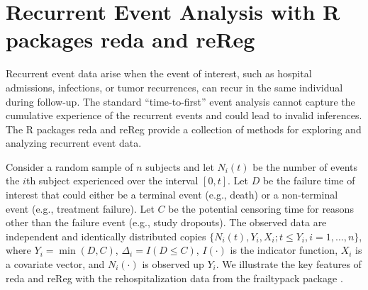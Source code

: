 \documentclass{report}
\let\proglang=\textsf
\newcommand{\pkg}[1]{{\fontseries{b}\selectfont #1}}
\begin{document}
\section*{Recurrent Event Analysis with \proglang{R} packages \pkg{reda} and \pkg{reReg}}

Recurrent event data arise when the event of interest,
such as hospital admissions, infections, or tumor recurrences,
can recur in the same individual during follow-up.
The standard ``time-to-first'' event analysis cannot capture the cumulative experience of
the recurrent events and could lead to invalid inferences.
The \proglang{R} packages \pkg{reda} \citep{reda-package} and \pkg{reReg} \citep{reReg-package}
provide a collection of methods for exploring and analyzing 
recurrent event data.


Consider a random sample of $n$ subjects and let
$N_i(t)$ be the number of events the $i$th subject experienced over the interval $[0, t]$. 
Let $D$ be the failure time of interest that could either be a terminal event (e.g., death)
or a non-terminal event (e.g., treatment failure).
Let $C$ be the potential censoring time for reasons other than the failure event
(e.g., study dropouts).
The observed data are independent and identically distributed copies
$\{N_i(t), Y_i, X_i; t\le Y_i, i = 1, \ldots, n\}$,
where $Y_i = \min(D, C)$, $\Delta_i = I(D\le C)$,
$I(\cdot)$ is the indicator function,
$X_i$ is a covariate vector, 
and $N_i(\cdot)$ is observed up $Y_i$.
We illustrate the key features of \pkg{reda} and \pkg{reReg} with the 
rehospitalization data %
from the \pkg{frailtypack} package \citep{fp}.









\renewcommand{\bibsection}{\section*{Reference}}
\setlength{\bibhang}{0pt}
\setlength{\bibsep}{0.4em}


\end{document}
